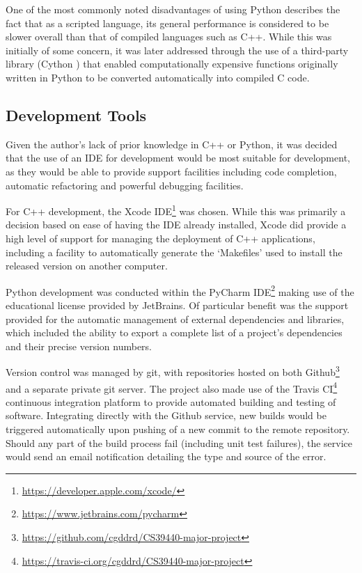 One of the most commonly noted disadvantages of using Python describes the fact that as a scripted language, its general performance is considered to be slower overall than that of compiled languages such as C++. While this was initially of some concern, it was later addressed through the use of a third-party library (Cython \cite{cython}) that enabled computationally expensive functions originally written in Python to be converted automatically into compiled C code.

\subsection{Development Tools}
\label{develtools}

Given the author's lack of prior knowledge in C++ or Python, it was decided that the use of an IDE for development would be most suitable for development, as they would be able to provide support facilities including code completion, automatic refactoring and powerful debugging facilities. 

For C++ development, the Xcode IDE\footnote{\url{https://developer.apple.com/xcode/}} was chosen. While this was primarily a decision based on ease of having the IDE already installed, Xcode did provide a high level of support for managing the deployment of C++ applications, including a facility to automatically generate the `Makefiles' used to install the released version on another computer. 

Python development was conducted within the PyCharm IDE\footnote{\url{https://www.jetbrains.com/pycharm}} making use of the educational license provided by JetBrains. Of particular benefit was the support provided for the automatic management of external dependencies and libraries, which included the ability to export a complete list of a project's dependencies and their precise version numbers.

Version control was managed by git, with repositories hosted on both Github\footnote{\url{https://github.com/cgddrd/CS39440-major-project}} and a separate private git server. The project also made use of the Travis CI\footnote{\url{https://travis-ci.org/cgddrd/CS39440-major-project}} continuous integration platform to provide automated building and testing of software. Integrating directly with the Github service, new builds would be triggered automatically upon pushing of a new commit to the remote repository. Should any part of the build process fail (including unit test failures), the service would send an email notification detailing the type and source of the error.  

